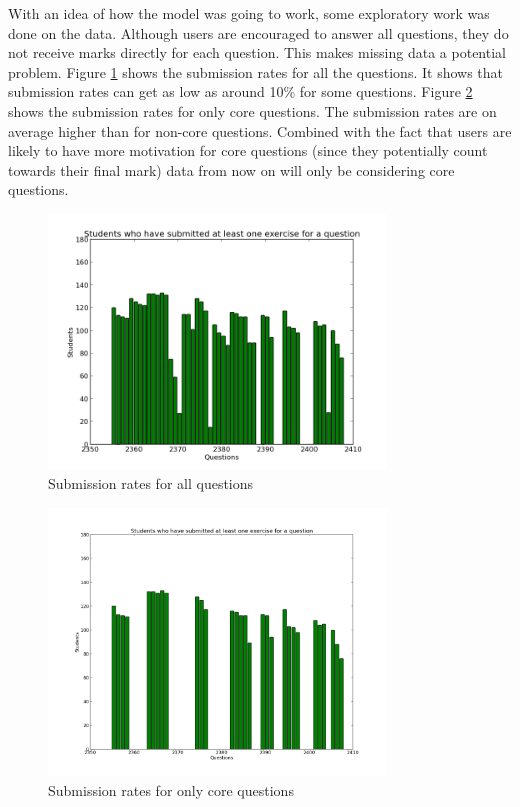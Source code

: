 With an idea of how the model was going to work, some exploratory work was done on the data. Although users are encouraged to answer all questions, they do not receive marks directly for each question. This makes missing data a potential problem. Figure \ref{fig:missing_data} shows the submission rates for all the questions. It shows that submission rates can get as low as around 10\% for some questions. Figure \ref{fig:missing_data_core} shows the submission rates for only core questions. The submission rates are on average higher than for non-core questions. Combined with the fact that users are likely to have more motivation for core questions (since they potentially count towards their final mark) data from now on will only be considering core questions.

\begin{figure}[h!] 
\centering
\includegraphics[width=0.8\textwidth]{images/missing_data.png}
\caption{Submission rates for all questions}
\label{fig:missing_data}
\end{figure}

\begin{figure}[h!]
\centering
\includegraphics[width=0.8\textwidth]{images/missing_data_core.png}
\caption{Submission rates for only core questions}
\label{fig:missing_data_core}
\end{figure}

